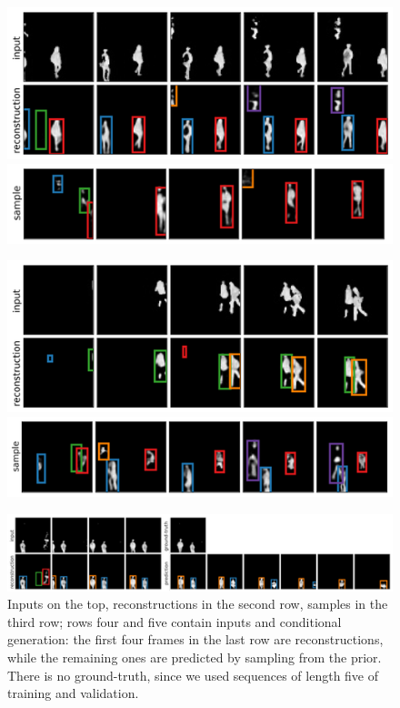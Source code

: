 \begin{figure}
    \centering
    \begin{minipage}[c]{0.49\linewidth}
        \centering
        \includegraphics[width=\linewidth]{figures/SQAIR/duke_rec/front/000065}
        \includegraphics[width=\linewidth]{figures/SQAIR/duke_sample/front/sqair_duke_sample_with_label_296}
    \end{minipage}
    \hfill
    \begin{minipage}[c]{0.49\linewidth}
        \centering
        \includegraphics[width=\linewidth]{figures/SQAIR/duke_rec/front/000099}
       \includegraphics[width=\linewidth]{figures/SQAIR/duke_sample/front/sqair_duke_sample_with_label_020}
    \end{minipage}
    \includegraphics[width=.95\linewidth]{figures/SQAIR/duke_cond_gen/front/sqair_duke_cond_after_four}
    \caption{Inputs on the top, reconstructions in the second row, samples in the third row; rows four and five contain inputs and conditional generation: the first four frames in the last row are reconstructions, while the remaining ones are predicted by sampling from the prior. There is no ground-truth, since we used sequences of length five of training and validation.}
    \label{fig:duke_rec}
\end{figure}
